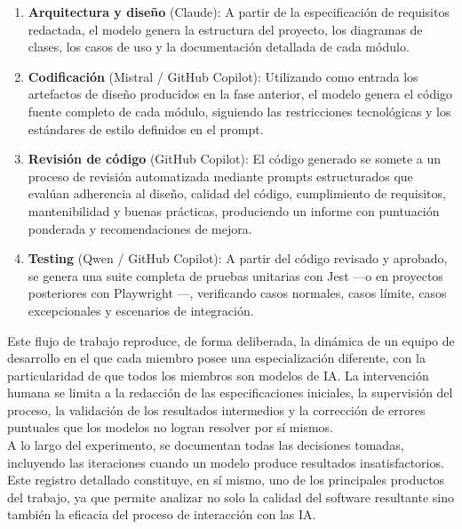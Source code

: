 \begin{enumerate}
  \item \textbf{Arquitectura y diseño} (Claude): A partir de la especificación de requisitos redactada, el modelo genera la estructura del proyecto, los diagramas de clases, los casos de uso y la documentación detallada de cada módulo.

  \item \textbf{Codificación} (Mistral / GitHub Copilot): Utilizando como entrada los artefactos de diseño producidos en la fase anterior, el modelo genera el código fuente completo de cada módulo, siguiendo las restricciones tecnológicas y los estándares de estilo definidos en el prompt.

  \item \textbf{Revisión de código} (GitHub Copilot): El código generado se somete a un proceso de revisión automatizada mediante prompts estructurados que evalúan adherencia al diseño, calidad del código, cumplimiento de requisitos, mantenibilidad y buenas prácticas, produciendo un informe con puntuación ponderada y recomendaciones de mejora.

    \item \textbf{Testing} (Qwen  / GitHub Copilot): A partir del código revisado y aprobado, se genera una suite completa de pruebas unitarias con Jest \cite{URL::Jest} ---o en proyectos posteriores con Playwright \cite{URL::Playwright}---, verificando casos normales, casos límite, casos excepcionales y escenarios de integración.
\end{enumerate}

Este flujo de trabajo reproduce, de forma deliberada, la dinámica de un equipo de desarrollo en el que cada miembro posee una especialización diferente, con la particularidad de que todos los miembros son modelos de \ac{IA}. La intervención humana se limita a la redacción de las especificaciones iniciales, la supervisión del proceso, la validación de los resultados intermedios y la corrección de errores puntuales que los modelos no logran resolver por sí mismos.\\

A lo largo del experimento, se documentan todas las decisiones tomadas, incluyendo las iteraciones cuando un modelo produce resultados insatisfactorios. Este registro detallado constituye, en sí mismo, uno de los principales productos del trabajo, ya que permite analizar no solo la calidad del software resultante sino también la eficacia del proceso de interacción con las \ac{IA}.\\

